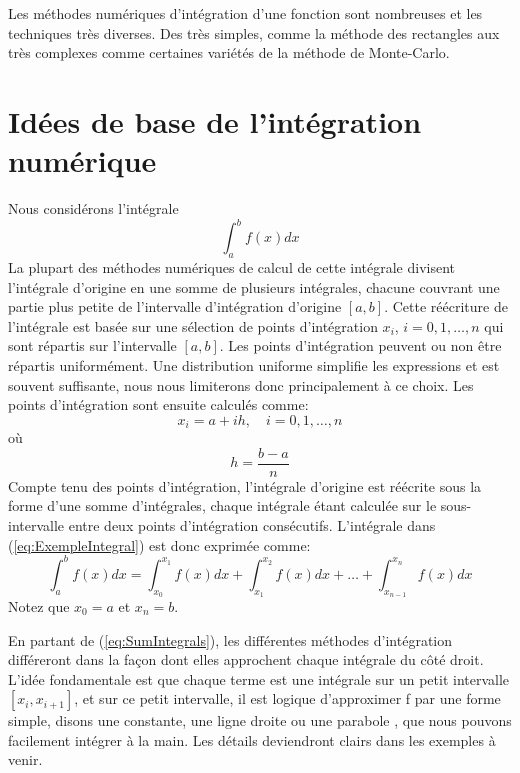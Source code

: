 \documentclass[%
oneside,                 %
final,                   %
10pt]{article}
\begin{document}
\noindent
Les méthodes numériques d'intégration d'une fonction sont nombreuses et les techniques très diverses. Des très simples, comme la méthode des rectangles aux très complexes comme certaines variétés de la méthode de Monte-Carlo.

\section{Idées de base de l'intégration numérique}
Nous considérons l'intégrale
\begin{equation} \label{eq:ExempleIntegral}
\int_a^b f(x)dx
\end{equation}
La plupart des méthodes numériques de calcul de cette intégrale divisent l'intégrale d'origine en une somme de plusieurs intégrales, chacune couvrant une partie plus petite de l'intervalle d'intégration d'origine $[a, b]$. Cette réécriture de l'intégrale est basée sur une sélection de points d'intégration $x_i$, $i = 0,1,…, n$ qui sont répartis sur l'intervalle $[a, b]$. Les points d'intégration peuvent ou non être répartis uniformément. Une distribution uniforme simplifie les expressions et est souvent suffisante, nous nous limiterons donc principalement à ce choix. Les points d'intégration sont ensuite calculés comme:
\begin{equation}
x_i = a + ih,\quad i = 0,1,\ldots,n
\end{equation}
où
\begin{equation}
h = \frac{b-a}{n}
\end{equation}
Compte tenu des points d'intégration, l'intégrale d'origine est réécrite sous la forme d'une somme d'intégrales, chaque intégrale étant calculée sur le sous-intervalle entre deux points d'intégration consécutifs. L'intégrale dans (\ref{eq:ExempleIntegral}) est donc exprimée comme:
\begin{equation} \label{eq:SumIntegrals}
\int_a^b f(x)dx =
\int_{x_0}^{x_1} f(x)dx + \int_{x_1}^{x_2} f(x)dx + \ldots +
\int_{x_{n-1}}^{x_n} f(x)dx
\end{equation}
Notez que $x_0 = a$ et $x_n = b$.

En partant de (\ref{eq:SumIntegrals}), les différentes méthodes d'intégration différeront dans la façon dont elles approchent chaque intégrale du côté droit. L'idée fondamentale est que chaque terme est une intégrale sur un petit intervalle $[x_i, x_{i + 1}]$, et sur ce petit intervalle, il est logique d'approximer f par une forme simple, disons une constante, une ligne droite ou une parabole , que nous pouvons facilement intégrer à la main. Les détails deviendront clairs dans les exemples à venir.
\end{document}
